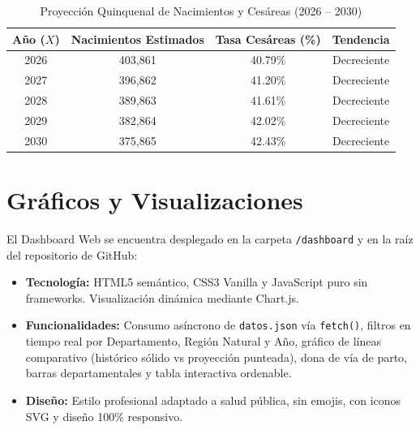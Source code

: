 \documentclass[12pt,a4paper]{article}
\begin{document}
\begin{table}[htbp]
    \centering
    \caption{Proyección Quinquenal de Nacimientos y Cesáreas (2026 -- 2030)}
    \begin{tabular}{cccc}
        \toprule
        \textbf{Año ($X$)} & \textbf{Nacimientos Estimados} & \textbf{Tasa Cesáreas (\%)} & \textbf{Tendencia} \\
        \midrule
        2026 & 403,861 & 40.79\% & Decreciente \\
        2027 & 396,862 & 41.20\% & Decreciente \\
        2028 & 389,863 & 41.61\% & Decreciente \\
        2029 & 382,864 & 42.02\% & Decreciente \\
        2030 & 375,865 & 42.43\% & Decreciente \\
        \bottomrule
    \end{tabular}
\end{table}

\section{Gráficos y Visualizaciones}

El Dashboard Web se encuentra desplegado en la carpeta \texttt{/dashboard} y en la raíz del repositorio de GitHub:
\begin{itemize}
    \item \textbf{Tecnología:} HTML5 semántico, CSS3 Vanilla y JavaScript puro sin frameworks. Visualización dinámica mediante Chart.js.
    \item \textbf{Funcionalidades:} Consumo asíncrono de \texttt{datos.json} vía \texttt{fetch()}, filtros en tiempo real por Departamento, Región Natural y Año, gráfico de líneas comparativo (histórico sólido vs proyección punteada), dona de vía de parto, barras departamentales y tabla interactiva ordenable.
    \item \textbf{Diseño:} Estilo profesional adaptado a salud pública, sin emojis, con iconos SVG y diseño 100\% responsivo.
\end{itemize}

\end{document}
